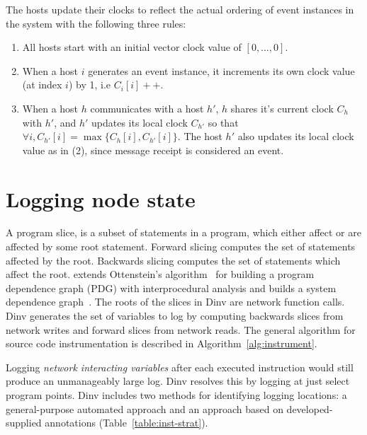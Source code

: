 The hosts update their clocks to reflect the actual ordering of event
instances in the system with the following three rules:

\begin{enumerate}

    \item All hosts start with an initial vector clock value of
        $[0,\dots,0]$.

    \item When a host $i$ generates an event instance, it increments
        its own clock value (at index $i$) by 1, i.e $C_i[i]++$.

    \item When a host $h$ communicates with a host $h'$, $h$ shares
        it's current clock $C_h$ with $h'$, and $h'$ updates its local
        clock $C_{h'}$ so that $\forall i, C_{h'}[i] =
        \max\{C_h[i],C_{h'}[i]\}$. The host $h'$ also updates its local
        clock value as in (2), since message receipt is considered an
        event.

\end{enumerate}




\section{Logging node state}
\label{sec:logging-variables}

A program slice, is a subset of statements in a program, which either
affect or are affected by some root statement. Forward slicing
computes the set of statements affected by the root. Backwards slicing
computes the set of statements which affect the root. \dinv extends
Ottenstein's algorithm~\cite{Ottenstein:1984} for building a program
dependence graph (PDG) with interprocedural analysis and builds a
system dependence graph~\cite{Walkinshaw03thejava}. The roots of the
slices in Dinv are network function calls. Dinv generates the set of
variables to log by computing backwards slices from network writes and
forward slices from network reads. The general algorithm for source
code instrumentation is described in Algorithm~\ref{alg:instrument}.

Logging \emph{network interacting variables} after each executed
instruction would still produce an unmanageably large log. Dinv
resolves this by logging at just select program points. Dinv includes
two methods for identifying logging locations: a general-purpose
automated approach and an approach based on developed-supplied
annotations (Table~\ref{table:inst-strat}).

